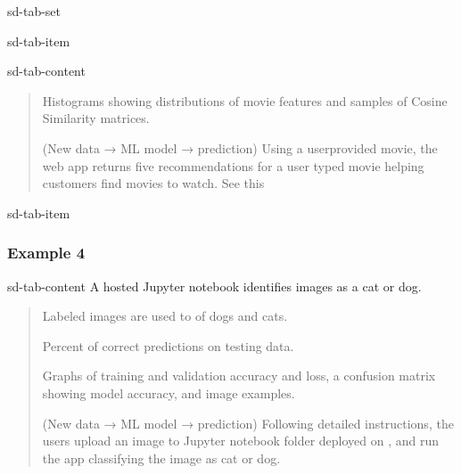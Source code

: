 \documentclass[letterpaper,10pt,english]{jupyterBook}
\begin{document}
\begin{sphinxuseclass}{sd-tab-set}
\begin{sphinxuseclass}{sd-tab-item}
\begin{sphinxuseclass}{sd-tab-content}
\begin{quote}
\sphinxAtStartPar
{} Histograms showing distributions of movie features and samples of Cosine Similarity matrices.

\sphinxAtStartPar
{} (New data → ML model → prediction) Using a user\sphinxhyphen{}provided movie, the web app returns five recommendations for a user typed movie helping customers find movies to watch. See this 
\end{quote}

\end{sphinxuseclass}
\end{sphinxuseclass}
\begin{sphinxuseclass}{sd-tab-item}\subsubsection*{Example 4}

\begin{sphinxuseclass}{sd-tab-content}
\sphinxAtStartPar
{} A hosted Jupyter notebook identifies images as a cat or dog.
\begin{quote}

\sphinxAtStartPar
{} Labeled images are used to  of dogs and cats.

\sphinxAtStartPar
{} Percent of correct predictions on testing data.

\sphinxAtStartPar
{} Graphs of training and validation accuracy and loss, a confusion matrix showing model accuracy, and image examples.

\sphinxAtStartPar
{} (New data → ML model → prediction) Following detailed instructions, the users upload an image to Jupyter notebook folder deployed on , and run the app classifying the image as cat or dog.
\end{quote}

\end{sphinxuseclass}
\end{sphinxuseclass}
\end{sphinxuseclass}
\end{document}
